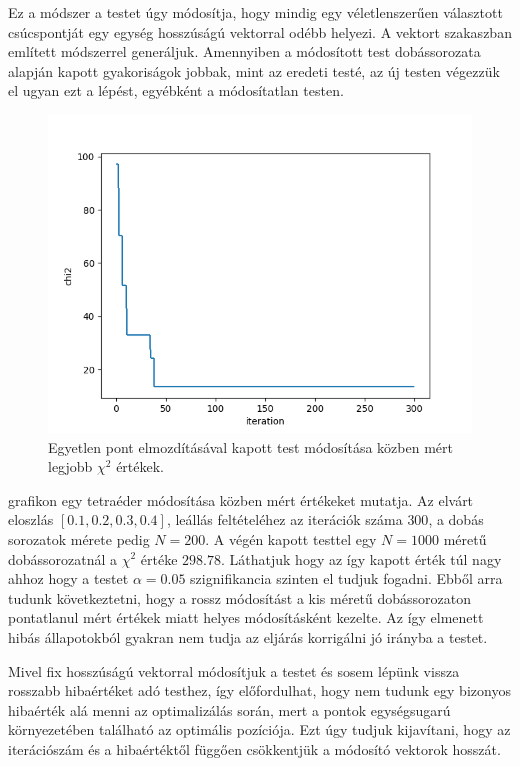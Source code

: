 \label{sect:randmodification}

Ez a módszer a testet úgy módosítja, hogy mindig egy véletlenszerűen választott csúcspontját egy egység hosszúságú vektorral odébb helyezi.
A vektort  szakaszban említett módszerrel generáljuk.
Amennyiben a módosított test dobássorozata alapján kapott gyakoriságok jobbak, mint az eredeti testé, az új testen végezzük el ugyan ezt a lépést, egyébként a módosítatlan testen.
\begin{figure}[h!]
	\centering
	\includegraphics[scale=0.7]{images/randmodify_chi2.png}
	\caption{Egyetlen pont elmozdításával kapott test módosítása közben mért legjobb $\chi^2$ értékek.}
	\label{fig:randmodify_chi2}
\end{figure}
 grafikon egy tetraéder módosítása közben mért értékeket mutatja.
Az elvárt eloszlás $[0.1, 0.2, 0.3, 0.4]$, leállás feltételéhez az iterációk száma $300$, a dobás sorozatok mérete pedig $N=200$.
A végén kapott testtel egy $N=1000$ méretű dobássorozatnál a $\chi^2$ értéke $298.78$.
Láthatjuk hogy az így kapott érték túl nagy ahhoz hogy a testet $\alpha = 0.05$ szignifikancia szinten el tudjuk fogadni.
Ebből arra tudunk következtetni, hogy a rossz módosítást a kis méretű dobássorozaton pontatlanul mért értékek miatt helyes módosításként kezelte.
Az így elmenett hibás állapotokból gyakran nem tudja az eljárás korrigálni jó irányba a testet.

Mivel fix hosszúságú vektorral módosítjuk a testet és sosem lépünk vissza rosszabb hibaértéket adó testhez, így előfordulhat, hogy nem tudunk egy bizonyos hibaérték alá menni az optimalizálás során, mert a pontok egységsugarú környezetében található az optimális pozíciója.
Ezt úgy tudjuk kijavítani, hogy az iterációszám és a hibaértéktől függően csökkentjük a módosító vektorok hosszát.

